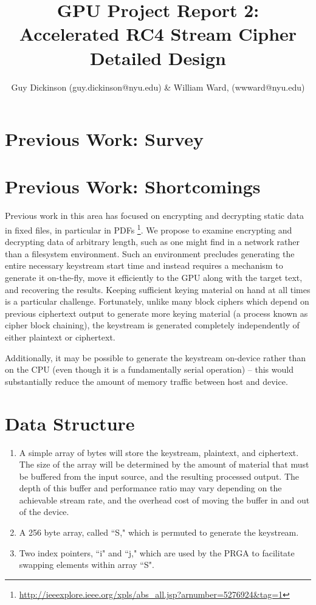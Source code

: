 \documentclass{article}
\begin{document}
  
  \title{GPU Project Report 2: Accelerated RC4 Stream Cipher Detailed Design}
  \author{Guy Dickinson (guy.dickinson@nyu.edu) \& William Ward, (wwward@nyu.edu)}
  \maketitle
  
  \section{Previous Work: Survey}
  
  \section{Previous Work: Shortcomings}
   Previous work in this area has focused on encrypting and decrypting static data in fixed files, in particular in PDFs \footnote{\url{http://ieeexplore.ieee.org/xpls/abs_all.jsp?arnumber=5276924&tag=1}}. We propose to examine encrypting and decrypting data of arbitrary length, such as one might find in a network rather than a filesystem environment. Such an environment precludes generating the entire necessary keystream start time and instead requires a mechanism to generate it on-the-fly, move it efficiently to the GPU along with the target text, and recovering the results. Keeping sufficient keying material on hand at all times is a particular challenge. Fortunately, unlike many block ciphers which depend on previous ciphertext output to generate more keying material (a process known as cipher block chaining), the keystream is generated completely independently of either plaintext or ciphertext.
   
   Additionally, it may be possible to generate the keystream on-device rather than on the CPU (even though it is a fundamentally serial operation) -- this would substantially reduce the amount of memory traffic between host and device.
   

  \section{Data Structure}
  
  \begin{enumerate}
    \item A simple array of bytes will store the keystream, plaintext, and ciphertext.  The size of the array will be determined by the amount of material that must be buffered from the input source, and the resulting processed output.  The depth of this buffer and performance ratio may vary depending on the achievable stream rate, and the overhead cost of moving the buffer in and out of the device.
    \item A 256 byte array, called ``S," which is permuted to generate the keystream.
    \item Two index pointers, ``i" and ``j," which are used by the PRGA to facilitate swapping elements within array ``S".
  \end{enumerate}
\end{document}
